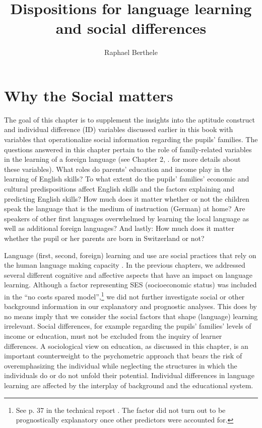 \documentclass[output=paper]{langsci/langscibook}
\author{Raphael Berthele\affiliation{University of Fribourg, Institut de Plurilinguisme}\orcid{}}
\title{Dispositions for language learning and social differences}
\begin{document}
\maketitle 


\section{Why the Social matters}

The goal of this chapter is to supplement the insights into the aptitude construct and individual difference (ID) variables discussed earlier in this book with variables that operationalize social information regarding the pupils’ families. The questions answered in this chapter pertain to the role of family-related variables in the learning of a foreign language (see Chapter 2, . for more details about these variables). What roles do parents’ education and income play in the learning of English skills? To what extent do the pupils' families' economic and cultural predispositions affect English skills and the factors explaining and predicting English skills? How much does it matter whether or not the children speak the language that is the medium of instruction (German) at home? Are speakers of other first languages overwhelmed by learning the local language as well as additional foreign languages? And lastly: How much does it matter whether the pupil or her parents are born in Switzerland or not?

Language (first, second, foreign) learning and use are social practices that rely on the human language making capacity \citep{Slobin1985}. In the previous chapters, we addressed several different cognitive and affective aspects that have an impact on language learning. Although a factor representing SES (socioeconomic status) was included in the ``no costs spared model'',{\footnote{See p. 37 in the technical report \citep{Vanhove2021}. The factor did not turn out to be prognostically explanatory once other predictors were accounted for.}} we did not further investigate social or other background information in our explanatory and prognostic analyses. This does by no means imply that we consider the social factors that shape (language) learning irrelevant. Social differences, for example regarding the pupils’ families’ levels of income or education, must not be excluded from the inquiry of learner differences. A sociological view on education, as discussed in this chapter, is an important counterweight to the psychometric approach that bears the risk of overemphasizing the individual while neglecting the structures in which the individuals do or do not unfold their potential. Individual differences in language learning are affected by the interplay of background and the educational system. 
\end{document}

